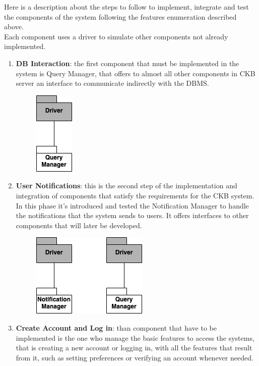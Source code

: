 Here is a description about the steps to follow to implement, integrate and test the components of the system following the features enumeration described above.
\\Each component uses a driver to simulate other components not already implemented.

\begin{enumerate}
    \vspace{1cm}
    \item \textbf{DB Interaction}: the first component that must be implemented in the system is Query Manager, that offers to almost all other components in CKB server an interface to communicate indirectly with the DBMS.
    \vspace{0.5cm}
    \begin{figure}[H]
        \centering
        \includegraphics[scale=0.6]{src/phase0.drawio.png}
    \end{figure} 
    \vspace{0.5cm}
    \newpage
    \item \textbf{User Notifications}: this is the second step of the implementation and integration of components that satisfy the requirements for the CKB system. In this phase it's introduced and tested the Notification Manager to handle the notifications that the system sends to users. It offers interfaces to other components that will later be developed.
    \vspace{0.5cm}
    \begin{figure}[H]
        \centering
        \includegraphics[scale=0.6]{src/phase1.drawio.png}
    \end{figure} 
    \vspace{2cm}
    \item \textbf{Create Account and Log in}: than component that have to be implemented is the one who manage the basic features to access the systems, that is creating a new account or logging in, with all the features that result from it, such as setting preferences or verifying an account whenever needed.

\end{enumerate}
